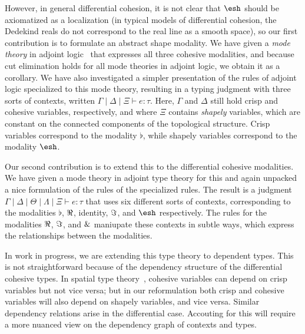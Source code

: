 \documentclass{article}
\begin{document}
However, in general differential cohesion, it is not clear that $\shape$
should be axiomatized as a localization (in typical models of
differential cohesion, the Dedekind reals do not correspond to the real
line as a smooth space), so our first contribution is to formulate an
abstract shape modality.  We have given a \emph{mode theory} in adjoint
logic~\citep{Licata2017} that expresses all three cohesive modalities,
and because cut elimination holds for all mode theories in adjoint
logic, we obtain it as a corollary.  We have also investigated a simpler
presentation of the rules of adjoint logic specialized to this mode
theory, resulting in a typing judgment with three sorts of contexts,
written $\Gamma \mid \Delta \mid \Xi \vdash e : \tau$.  Here, $\Gamma$
and $\Delta$ still hold crisp and cohesive variables, respectively, and
where $\Xi$ contains \emph{shapely} variables, which are constant on the
connected components of the topological structure.  Crisp variables
correspond to the modality $\flat$, while shapely variables correspond
to the modality $\shape$.

Our second contribution is to extend this to the differential cohesive
modalities.  We have given a mode theory in adjoint type theory for this
and again unpacked a nice formulation of the rules of the specialized
rules.  The result is a judgment $\Gamma \mid \Delta \mid \Theta \mid
\Lambda \mid \Xi \vdash e : \tau$ that uses six different sorts of
contexts, corresponding to the modalities $\flat$, $\Re$, identity,
$\Im$, and $\shape$ respectively.  The rules for the modalities
$\Re$, $\Im$, and $\&$ maniupate these contexts in subtle ways,
which express the relationships between the modalities.

In work in progress, we are extending this type theory to dependent
types. This is not straightforward because of the dependency structure
of the differential cohesive types. In spatial type
theory~\citep{Shulman2015}, cohesive variables can depend on crisp
variables but not vice versa; but in our reformulation both crisp and
cohesive variables will also depend on shapely variables, and vice
versa.  Similar dependency relations arise in the differential case.
Accouting for this will require a more nuanced view on the dependency
graph of contexts and types.

\end{document}
